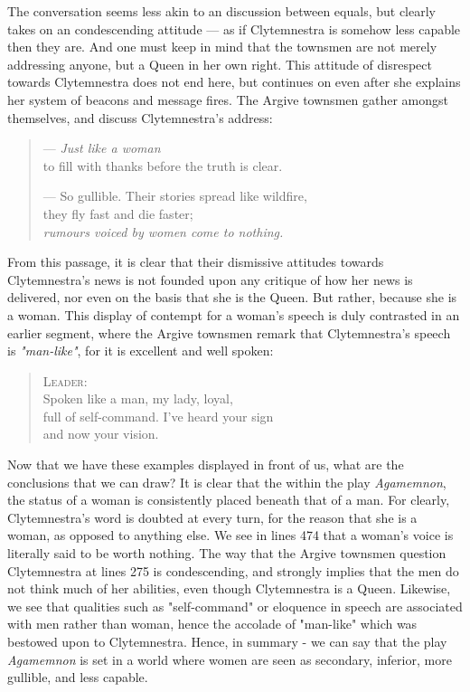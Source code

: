 \noindent
The conversation seems less akin to an discussion between equals, but clearly
takes on an condescending attitude --- as if Clytemnestra is somehow less
capable then they are. And one must keep in mind that the townsmen are
not merely addressing anyone, but a Queen in her own right. This attitude of
disrespect towards Clytemnestra does not end here, but continues on even after
she explains her system of beacons and message fires. The Argive townsmen gather
amongst themselves, and discuss Clytemnestra's address:

\begin{quote}
  --- \emph{Just like a woman} \\
  to fill with thanks before the truth is clear.

  --- So gullible. Their stories spread like wildfire, \\
  they fly fast and die faster; \\
  \emph{rumours voiced by women come to nothing.}

  \autocite[474]{fagles}
\end{quote}

\noindent
From this passage, it is clear that their dismissive attitudes towards
Clytemnestra's news is not founded upon any critique of how her news is
delivered, nor even on the basis that she is the Queen. But rather, because she
is a woman. This display of contempt for a woman's speech is duly contrasted in
an earlier segment, where the Argive townsmen remark that Clytemnestra's
speech is \emph{"man-like"}, for it is excellent and well spoken:

\begin{quote}
  \textsc{Leader}: \\
  Spoken like a man, my lady, loyal, \\
  full of self-command. I've heard your sign \\
  and now your vision. \\

  \autocite[355]{Fagles}
\end{quote}

Now that we have these examples displayed in front of us, what are the
conclusions that we can draw? It is clear that the within the play
\emph{Agamemnon}, the status of a woman is consistently placed beneath that of a
man. For clearly, Clytemnestra's word is doubted at every turn, for the reason
that she is a woman, as opposed to anything else. We see in lines 474 that a
woman's voice is literally said to be worth nothing. The way that the Argive
townsmen question Clytemnestra at lines 275 is condescending, and strongly
implies that the men do not think much of her abilities, even though
Clytemnestra is a Queen. Likewise, we see that qualities such as "self-command"
or eloquence in speech are associated with men rather than woman, hence the
accolade of "man-like" which was bestowed upon to Clytemnestra. Hence, in
summary - we can say that the play \emph{Agamemnon} is set in a world where
women are seen as secondary, inferior, more gullible, and less capable.

